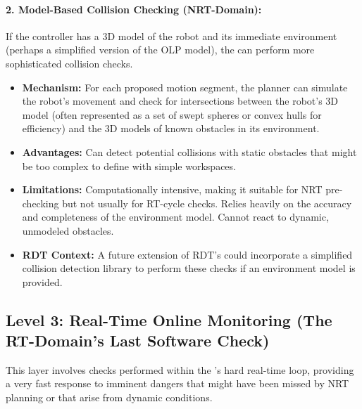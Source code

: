 \paragraph{ \textbf{2. Model-Based Collision Checking (NRT-Domain):}}
    If the controller has a 3D model of the robot and its immediate environment (perhaps a simplified version of the OLP model), the  can perform more sophisticated collision checks.
    \begin{itemize}
        \item \textbf{Mechanism:} For each proposed motion segment, the planner can simulate the robot's movement and check for intersections between the robot's 3D model (often represented as a set of swept spheres or convex hulls for efficiency) and the 3D models of known obstacles in its environment.
        \item \textbf{Advantages:} Can detect potential collisions with static obstacles that might be too complex to define with simple workspaces.
        \item \textbf{Limitations:} Computationally intensive, making it suitable for NRT pre-checking but not usually for RT-cycle checks. Relies heavily on the accuracy and completeness of the environment model. Cannot react to dynamic, unmodeled obstacles.
        \item \textbf{RDT Context:} A future extension of RDT's  could incorporate a simplified collision detection library to perform these checks if an environment model is provided.
    \end{itemize}


\subsection{Level 3: Real-Time Online Monitoring (The RT-Domain's Last Software Check)}
\label{subsec:rt_online_monitoring}
This layer involves checks performed within the 's hard real-time loop, providing a very fast response to imminent dangers that might have been missed by NRT planning or that arise from dynamic conditions.

